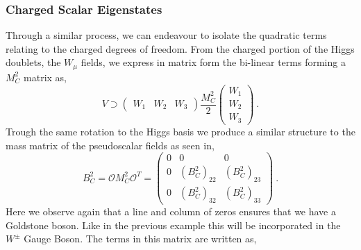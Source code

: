 \subsubsection{Charged Scalar Eigenstates}

Through a similar process, we can endeavour to isolate the quadratic terms relating to the charged degrees of freedom. From the charged portion of the Higgs doublets, the $W_\mu$ fields, we express in matrix form the bi-linear terms forming a $M_C^2$ matrix as, 
%
\begin{equation}
V \supset \left( \begin{array}{ccc} 
W_1 & W_2 & W_3 
\end{array} \right) 
\frac{M_C^2}{2} \left( \begin{array}{c}
W_1 \\ 
W_2 \\
W_3
\end{array} \right) \ .
\end{equation}
Trough the same rotation to the Higgs basis we produce a similar structure to the mass matrix of the pseudoscalar fields as seen in,  
%
%
\begin{equation}
\label{eq:3HDM_Charged_M1}
B^2_C = \mathcal{O} M_C^2 \mathcal{O}^T = \left( \begin{array}{ccc}
0 & 0 & 0 \\ 
0 & \left( B^2_C \right)_{22} &  \left( B^2_C \right)_{23} \\
0 & \left( B^2_C \right)_{32} &  \left( B^2_C \right)_{33}
\end{array} \right) \ .
\end{equation}
%
Here we observe again that a line and column of zeros ensures that we have a Goldstone boson. Like in the previous example this will be incorporated in the $W^\pm$ Gauge Boson. The terms in this matrix are written as,
%
%
%
